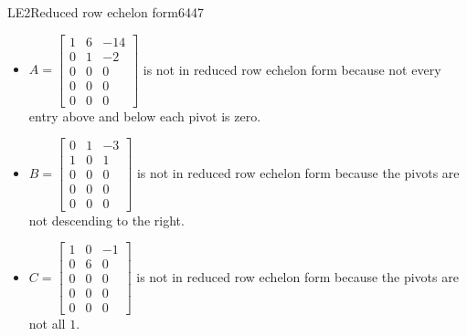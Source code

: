\begin{exercise}{LE2}{Reduced row echelon form}{6447}
\begin{exerciseStatement}
\begin{enumerate}[(a)]
 
\end{enumerate}

     \end{exerciseStatement}
 \begin{exerciseAnswer} 

\begin{itemize}
\item  

 \(A=\left[\begin{array}{ccc}
1 & 6 & -14 \\
0 & 1 & -2 \\
0 & 0 & 0 \\
0 & 0 & 0 \\
0 & 0 & 0
\end{array}\right]\) is not in reduced row echelon form because not every entry above and below each pivot is zero. 

 
\item  

 \(B=\left[\begin{array}{ccc}
0 & 1 & -3 \\
1 & 0 & 1 \\
0 & 0 & 0 \\
0 & 0 & 0 \\
0 & 0 & 0
\end{array}\right]\) is not in reduced row echelon form because the pivots are not descending to the right. 

 
\item  

 \(C=\left[\begin{array}{ccc}
1 & 0 & -1 \\
0 & 6 & 0 \\
0 & 0 & 0 \\
0 & 0 & 0 \\
0 & 0 & 0
\end{array}\right]\) is not in reduced row echelon form because the pivots are not all \(1\). 

 
\end{itemize}

     \end{exerciseAnswer}
 \end{exercise}


